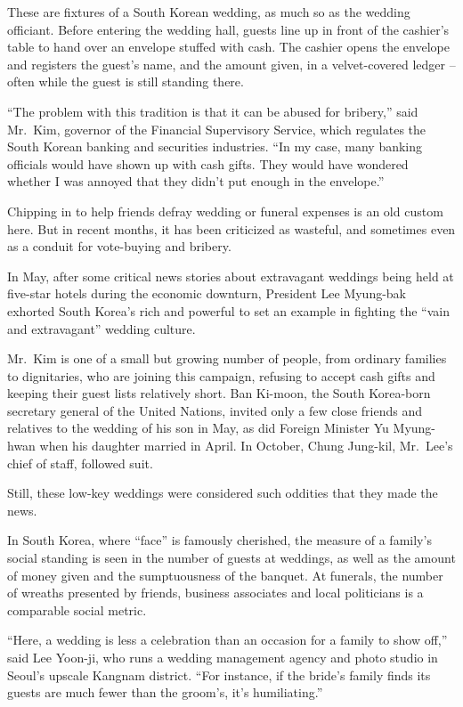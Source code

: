 ﻿\documentclass[12pt]{article}
\begin{document}
These are fixtures of a South Korean wedding, as much so as the wedding officiant. Before entering
the wedding hall, guests line up in front of the cashier's table to hand over an envelope stuffed
with cash. The cashier opens the envelope and registers the guest's name, and the amount given, in a
velvet-covered ledger -- often while the guest is still standing there.

``The problem with this tradition is that it can be abused for bribery,'' said Mr.~Kim, governor of
the Financial Supervisory Service, which regulates the South Korean banking and securities
industries. ``In my case, many banking officials would have shown up with cash gifts. They would
have wondered whether I was annoyed that they didn't put enough in the envelope.''

Chipping in to help friends defray wedding or funeral expenses is an old custom here. But in recent
months, it has been criticized as wasteful, and sometimes even as a conduit for vote-buying and
bribery.

In May, after some critical news stories about extravagant weddings being held at five-star hotels
during the economic downturn, President Lee Myung-bak exhorted South Korea's rich and powerful to
set an example in fighting the ``vain and extravagant'' wedding culture.

Mr.~Kim is one of a small but growing number of people, from ordinary families to dignitaries, who
are joining this campaign, refusing to accept cash gifts and keeping their guest lists relatively
short. Ban Ki-moon, the South Korea-born secretary general of the United Nations, invited only a few
close friends and relatives to the wedding of his son in May, as did Foreign Minister Yu Myung-hwan
when his daughter married in April. In October, Chung Jung-kil, Mr.~Lee's chief of staff, followed
suit.

Still, these low-key weddings were considered such oddities that they made the news.

In South Korea, where ``face'' is famously cherished, the measure of a family's social standing is
seen in the number of guests at weddings, as well as the amount of money given and the sumptuousness
of the banquet. At funerals, the number of wreaths presented by friends, business associates and
local politicians is a comparable social metric.

``Here, a wedding is less a celebration than an occasion for a family to show off,'' said Lee
Yoon-ji, who runs a wedding management agency and photo studio in Seoul's upscale Kangnam district.
``For instance, if the bride's family finds its guests are much fewer than the groom's, it's
humiliating.''
\end{document}
